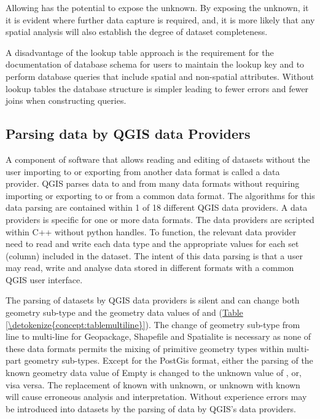 \documentclass[letterpaper,11pt,english]{sphinxmanual}
\begin{document}
Allowing  has the potential to expose the unknown.  By exposing the unknown, it it is evident where further data capture is required, and, it is more likely that any spatial analysis will also establish the degree of dataset completeness.

A disadvantage of the lookup table approach is the requirement for the documentation of database schema for users to maintain the lookup key and to perform database queries that include spatial and non-spatial attributes.  Without lookup tables the database structure is simpler leading to fewer errors and fewer joins when constructing queries.


\subsection{Parsing data by QGIS data Providers}
\label{\detokenize{concept:parsing-data-by-qgis-data-providers}}
A component of software that allows reading and editing of datasets without the user importing to or exporting from another data format is called a data provider. QGIS parses data to and from many data formats without requiring importing or exporting to or from a common data format.  The algorithms for this data parsing are contained within 1 of 18 different QGIS data providers.  A data providers is specific for one or more data formats.  The data providers are scripted within C++ without python handles.  To function, the relevant data provider need to read and write each data type and the appropriate values for each set (column) included in the dataset. The intent of this data parsing is that a user may read, write and analyse data stored in different formats with a common QGIS user interface.

The parsing of datasets by QGIS data providers is silent and can change both geometry sub-type and the geometry data values of  and  (\hyperref[\detokenize{concept:tablemultiline}]{Table \ref{\detokenize{concept:tablemultiline}}}).   The change of geometry sub-type from line to multi-line for Geopackage, Shapefile and Spatialite is necessary as none of these data formats permits the mixing of primitive geometry types within multi-part geometry sub-types.  Except for the PostGis format, either the parsing of the known geometry data value of Empty is changed to the unknown value of , or, visa versa.  The replacement of known with unknown, or unknown with known will cause erroneous analysis and interpretation.  Without experience errors may be introduced into datasets by the parsing of data by QGIS’s data providers.
\end{document}

